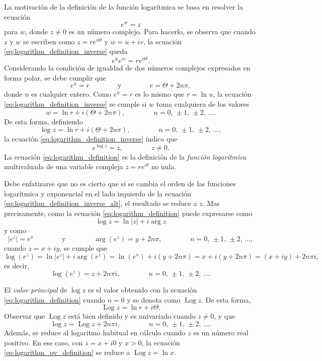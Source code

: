 \documentclass[a4paper]{report}
\DeclareMathOperator{\Log}{Log}
\begin{document}
La motivación de la definición de la función logarítmica se basa en resolver la ecuación
\begin{equation}\label{eq:logarithm_definition_inverse}
 e^w=z 
\end{equation}
para \(w\), donde \(z\neq0\) es un número complejo. Para hacerlo, se observa que cuando \(z\) y \(w\) se escriben como \(z=re^{i\Theta}\) y \(w=u+iv\), la ecuación \ref{eq:logarithm_definition_inverse} queda
\[
 e^ue^{iv}=re^{i\Theta}.
\]
Considerando la condición de igualdad de dos números complejos expresados en forma polar, se debe cumplir que 
\[
 e^u=r
 \qquad\qquad\textrm{y}\qquad\qquad
 v=\Theta+2n\pi,
\]
donde \(n\) es cualquier entero. Como \(e^u=r\) es lo mismo que \(r=\ln u\), la ecuación \ref{eq:logarithm_definition_inverse} se cumple si \(w\) toma cualquiera de los valores
\[
 w=\ln r+i(\Theta+2n\pi),\qquad\qquad n=0,\,\pm1,\,\pm2,\,\dots.
\]
De esta forma, definiendo
\begin{equation}\label{eq:logarithm_definition}
 \log z=\ln r+i(\Theta+2n\pi),\qquad\qquad n=0,\,\pm1,\,\pm2,\,\dots, 
\end{equation}
la ecuación \ref{eq:logarithm_definition_inverse} indica que 
\begin{equation}\label{eq:logarithm_definition_inverse_alt}
 e^{\log z}=z,\qquad\qquad z\neq0. 
\end{equation}
La ecuación \ref{eq:logarithm_definition} es la definición de la \emph{función logarítmica} multivaluada de una variable compleja \(z=re^{i\theta}\) no nula.

Debe enfatizarse que no es cierto que si se cambia el orden de las funciones logarítmica y exponencial en el lado izquierdo de la ecuación \ref{eq:logarithm_definition_inverse_alt}, el resultado se reduce a \(z\). Mas precisamente, como la ecuación \ref{eq:logarithm_definition} puede expresarse como
\[
 \log z=\ln|z|+i\arg z
\]
y como 
\[
 |e^z|=e^x
 \qquad\qquad\textrm{y}\qquad\qquad
 \arg(e^z)=y+2n\pi,\qquad\qquad n=0,\,\pm1,\,\pm2,\,\dots,
\]
cuando \(z=x+iy\), se cumple que 
\[
 \log(e^z)=\ln|e^z|+i\arg(e^z)=\ln(e^x)+i(y+2n\pi)=x+i(y+2n\pi)=(x+iy)+2n\pi i,
\]
es decir,
\begin{equation}\label{eq:logarithm_of_exponential}
 \log(e^z)=z+2n\pi i,\qquad\qquad n=0,\,\pm1,\,\pm2,\,\dots. 
\end{equation}

El \emph{valor principal} de \(\log z\) es el valor obtenido con la ecuación \ref{eq:logarithm_definition} cuando \(n=0\) y se denota como \(\Log z\). De esta forma,
\begin{equation}\label{eq:logarithm_pv_definition}
 \Log z=\ln r+i\Theta.
\end{equation}
Observar que \(\Log z\) está bien definido y es univariado cuando \(z\neq0\), y que
\begin{equation}\label{eq:logarithm_and_pv_relation}
 \log z=\Log z+2n\pi i,\qquad\qquad n=0,\,\pm1,\,\pm2,\,\dots. 
\end{equation}
Además, se reduce al logaritmo habitual en cálculo cuando \(z\) es un número real positivo. En ese caso, con \(z=x+i0\) y \(x>0\), la ecuación \ref{eq:logarithm_pv_definition} se reduce a \(\Log z=\ln x\).
\end{document}
